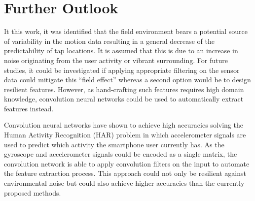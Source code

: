 \section{Further Outlook}
It this work, it was identified that the field environment bears a potential source of variability in the motion data resulting in a general decrease of the predictability of tap locations. It is assumed that this is due to an increase in noise originating from the user activity or vibrant surrounding. For future studies, it could be investigated if applying appropriate filtering on the sensor data could mitigate this ``field effect'' whereas a second option would be to design resilient features. However, as hand-crafting such features requires high domain knowledge, convolution neural networks could be used to automatically extract features instead.

Convolution neural networks have shown to achieve high accuracies solving the Human Activity Recognition (HAR) problem \cite{zeng2014convolutional} in which accelerometer signals are used to predict which activity the smartphone user currently has. As the gyroscope and accelerometer signals could be encoded as a single matrix, the convolution network is able to apply convolution filters on the input to automate the feature extraction process. This approach could not only be resilient against environmental noise but could also achieve higher accuracies than the currently proposed methods.


